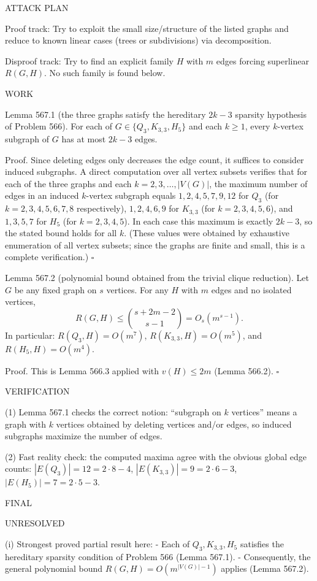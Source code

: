 ATTACK PLAN

Proof track:
Try to exploit the small size/structure of the listed graphs and reduce to known linear cases (trees or subdivisions) via decomposition.

Disproof track:
Try to find an explicit family $H$ with $m$ edges forcing superlinear $R(G,H)$.
No such family is found below.

WORK

Lemma 567.1 (the three graphs satisfy the hereditary $2k-3$ sparsity hypothesis of Problem 566).
For each of $G\in\{Q_3,K_{3,3},H_5\}$ and each $k\ge 1$, every $k$-vertex subgraph of $G$ has at most $2k-3$ edges.

Proof.
Since deleting edges only decreases the edge count, it suffices to consider induced subgraphs.
A direct computation over all vertex subsets verifies that for each of the three graphs and each $k=2,3,\dots,|V(G)|$,
the maximum number of edges in an induced $k$-vertex subgraph equals $1,2,4,5,7,9,12$ for $Q_3$ (for $k=2,3,4,5,6,7,8$ respectively),
$1,2,4,6,9$ for $K_{3,3}$ (for $k=2,3,4,5,6$),
and $1,3,5,7$ for $H_5$ (for $k=2,3,4,5$).
In each case this maximum is exactly $2k-3$, so the stated bound holds for all $k$.
(These values were obtained by exhaustive enumeration of all vertex subsets; since the graphs are finite and small, this is a complete verification.) \hfill$\square$

Lemma 567.2 (polynomial bound obtained from the trivial clique reduction).
Let $G$ be any fixed graph on $s$ vertices. For any $H$ with $m$ edges and no isolated vertices,
\[
R(G,H) \le \binom{s+2m-2}{s-1} = O_s(m^{s-1}).
\]
In particular:
$R(Q_3,H)=O(m^7)$, $R(K_{3,3},H)=O(m^5)$, and $R(H_5,H)=O(m^4)$.

Proof.
This is Lemma 566.3 applied with $v(H)\le 2m$ (Lemma 566.2). \hfill$\square$

VERIFICATION

(1) Lemma 567.1 checks the correct notion: ``subgraph on $k$ vertices'' means a graph with $k$ vertices obtained by deleting vertices and/or edges, so induced subgraphs maximize the number of edges.

(2) Fast reality check: the computed maxima agree with the obvious global edge counts:
$|E(Q_3)|=12=2\cdot 8-4$, $|E(K_{3,3})|=9=2\cdot 6-3$, $|E(H_5)|=7=2\cdot 5-3$.

FINAL

UNRESOLVED

(i) Strongest proved partial result here:
- Each of $Q_3,K_{3,3},H_5$ satisfies the hereditary sparsity condition of Problem 566 (Lemma 567.1).
- Consequently, the general polynomial bound $R(G,H)=O(m^{|V(G)|-1})$ applies (Lemma 567.2).

